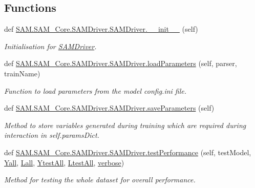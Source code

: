 \subsection*{Functions}
\begin{DoxyCompactItemize}
\item 
def \hyperlink{group__icubclient__SAM__Drivers_gac35ec3eea80d1fb5704758a9c53267a1}{S\+A\+M.\+S\+A\+M\+\_\+\+Core.\+S\+A\+M\+Driver.\+S\+A\+M\+Driver.\+\_\+\+\_\+init\+\_\+\+\_\+} (self)
\begin{DoxyCompactList}\small\item\em Initialisation for \hyperlink{group__icubclient__SAM__Drivers_classSAM_1_1SAM__Core_1_1SAMDriver_1_1SAMDriver}{S\+A\+M\+Driver}. \end{DoxyCompactList}\item 
def \hyperlink{group__icubclient__SAM__Drivers_gaa44829106cbdec9d9548151582908dce}{S\+A\+M.\+S\+A\+M\+\_\+\+Core.\+S\+A\+M\+Driver.\+S\+A\+M\+Driver.\+load\+Parameters} (self, parser, train\+Name)
\begin{DoxyCompactList}\small\item\em Function to load parameters from the model config.\+ini file. \end{DoxyCompactList}\item 
def \hyperlink{group__icubclient__SAM__Drivers_gac6f300d2daf748b11b28802574b6f5e8}{S\+A\+M.\+S\+A\+M\+\_\+\+Core.\+S\+A\+M\+Driver.\+S\+A\+M\+Driver.\+save\+Parameters} (self)
\begin{DoxyCompactList}\small\item\em Method to store variables generated during training which are required during interaction in self.\+params\+Dict. \end{DoxyCompactList}\item 
def \hyperlink{group__icubclient__SAM__Drivers_ga282ca575179c9374f26da33269b14ea7}{S\+A\+M.\+S\+A\+M\+\_\+\+Core.\+S\+A\+M\+Driver.\+S\+A\+M\+Driver.\+test\+Performance} (self, test\+Model, \hyperlink{group__icubclient__SAM__Drivers_ga99651a34f71273b720039e8f4d4b03a4}{Yall}, \hyperlink{group__icubclient__SAM__Drivers_ga4b259685c2b7fddfc554f75eee45389a}{Lall}, \hyperlink{group__icubclient__SAM__Drivers_ga61bc4612a1dd3b5d593798bb7e338c81}{Ytest\+All}, \hyperlink{group__icubclient__SAM__Drivers_ga47bb2e79cf8b5f8e071ab6208cf25dd0}{Ltest\+All}, \hyperlink{group__icubclient__SAM__Drivers_ga48cfefc6532ba606936b9fd7f3156da8}{verbose})
\begin{DoxyCompactList}\small\item\em Method for testing the whole dataset for overall performance. \end{DoxyCompactList}\item 

\end{DoxyCompactItemize}
